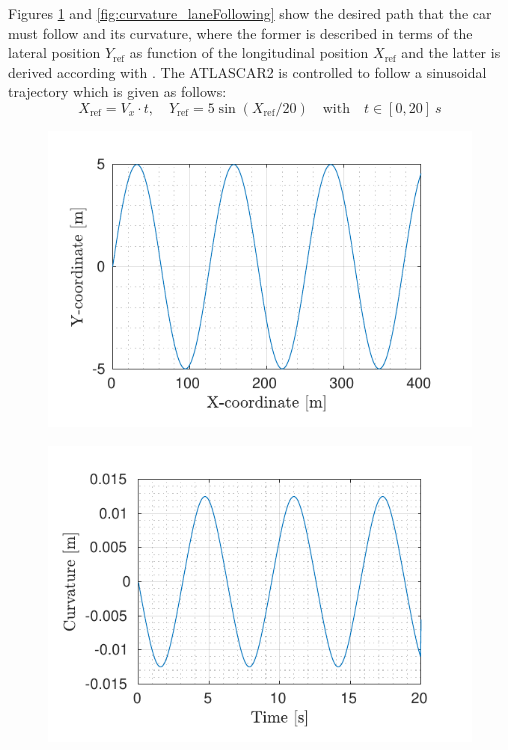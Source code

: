 \documentclass[conference,11pt]{IEEEtran}
\begin{document}
Figures \ref{fig:reference_laneFollowing} and \ref{fig:curvature_laneFollowing} show the desired path that the car must follow and its curvature, where the former is described in terms of the lateral position $Y_{\text{ref}}$ as function of the longitudinal position $X_{\text{ref}}$ and the latter is derived according with \cite{curvature}. The ATLASCAR2 is controlled to follow a sinusoidal trajectory which is given as follows:
\begin{equation*}
X_\text{ref}=V_x\cdot t, \quad Y_\text{ref}=5\sin(X_\text{ref}/20)\quad \text{with}\quad t\in[0,20]\SI{}{s}
\end{equation*}
\begin{figure}[!t]
	\centering
	\begin{minipage}[t]{\columnwidth}
		\includegraphics[width=\columnwidth]{../../MATLAB/lane_following/figure/Reference.pdf}
		\vspace{-17pt}
		\subcaption{}
		\label{fig:reference_laneFollowing}
	\end{minipage}
	\begin{minipage}[t]{\columnwidth}
		\includegraphics[width=\columnwidth]{../../MATLAB/lane_following/figure/Curvature.pdf}

\end{minipage}
\end{figure}
\end{document}
